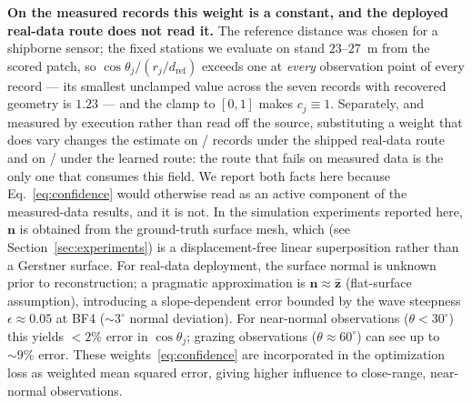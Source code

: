 \documentclass[review]{elsarticle}
\begin{document}
\textbf{On the measured records this weight is a constant, and the deployed real-data
route does not read it.} The reference distance was chosen for a shipborne sensor; the
fixed stations we evaluate on stand $23$--$27$~m from the scored patch, so
$\cos\theta_j/(r_j/d_{\text{ref}})$ exceeds one at \emph{every} observation point of
every record --- its smallest unclamped value across the seven records with recovered
geometry is $1.23$ --- and the clamp to $[0,1]$ makes $c_j \equiv 1$. Separately, and
measured by execution rather than read off the source, substituting a weight that does
vary changes the estimate on \RSixShipChanged{}/\RSixN{} records under the shipped
real-data route and on \RSixPropChanged{}/\RSixN{} under the learned route: the route that fails on measured data is the
only one that consumes this field. We report both facts here because Eq.~\ref{eq:confidence}
would otherwise read as an active component of the measured-data results, and it is not.
In the simulation experiments reported here, $\mathbf{n}$ is obtained
from the ground-truth surface mesh, which (see
Section~\ref{sec:experiments}) is a displacement-free linear
superposition rather than a Gerstner surface.  For real-data deployment,
the surface normal is unknown prior to reconstruction; a pragmatic
approximation is $\mathbf{n} \approx \hat{\mathbf{z}}$ (flat-surface
assumption), introducing a slope-dependent error bounded by the wave
steepness $\epsilon \approx 0.05$ at BF4 (${\sim}3^\circ$ normal
deviation). For near-normal observations ($\theta < 30^\circ$) this
yields $<2\%$ error in $\cos\theta_j$; grazing observations
($\theta \approx 60^\circ$) can see up to ${\sim}9\%$ error.
These weights~\eqref{eq:confidence} are incorporated in the optimization loss as weighted
mean squared error, giving higher influence to close-range,
near-normal observations.
\end{document}
